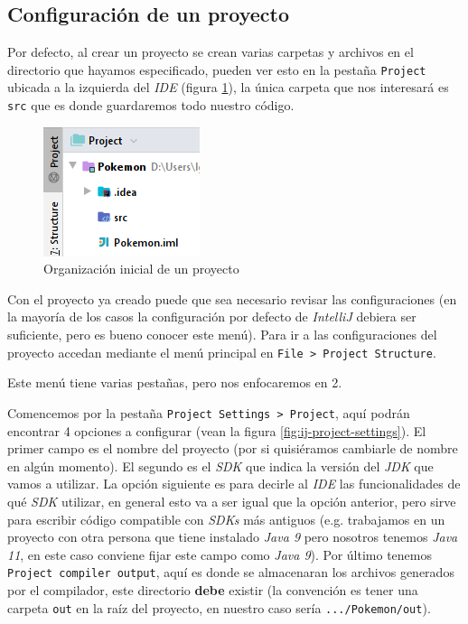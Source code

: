 \subsection{Configuración de un proyecto}
  Por defecto, al crear un proyecto se crean varias carpetas y archivos en el directorio que hayamos
  especificado, pueden ver esto en la pestaña \texttt{Project} ubicada a la izquierda del 
  \textit{IDE} (figura \ref{fig:project-fs}), la única carpeta que nos interesará es \texttt{src} 
  que es donde guardaremos todo nuestro código.

  \begin{figure}[ht!]
    \centering
    \includegraphics{img/Profundizando en Java/IntellJ Project FS.png}
    \caption{Organización inicial de un proyecto}
    \label{fig:project-fs}
  \end{figure}

  Con el proyecto ya creado puede que sea necesario revisar las configuraciones (en la mayoría de 
  los casos la configuración por defecto de \textit{IntelliJ} debiera ser suficiente, pero es bueno
  conocer este menú).
  Para ir a las configuraciones del proyecto accedan mediante el menú principal en \texttt{File > 
  Project Structure}.

  Este menú tiene varias pestañas, pero nos enfocaremos en 2.

  Comencemos por la pestaña \texttt{Project Settings > Project}, aquí podrán encontrar 4 opciones a 
  configurar (vean la figura \ref{fig:ij-project-settings}).
  El primer campo es el nombre del proyecto (por si quisiéramos cambiarle de nombre en algún 
  momento). 
  El segundo es el \textit{SDK} que indica la versión del \textit{JDK} que vamos a 
  utilizar.
  La opción siguiente es para decirle al \textit{IDE} las funcionalidades de qué 
  \textit{SDK} utilizar, en general esto va a ser igual que la opción anterior, pero sirve para 
  escribir código compatible con \textit{SDKs} más antiguos (e.g. trabajamos en un proyecto con otra
  persona que tiene instalado \textit{Java 9} pero nosotros tenemos \textit{Java 11}, en este caso 
  conviene fijar este campo como \textit{Java 9}).
  Por último tenemos \texttt{Project compiler output}, aquí es donde se almacenaran los archivos 
  generados por el compilador, este directorio \textbf{debe} existir (la convención es tener una 
  carpeta \texttt{out} en la raíz del proyecto, en nuestro caso sería \texttt{.../Pokemon/out}).

